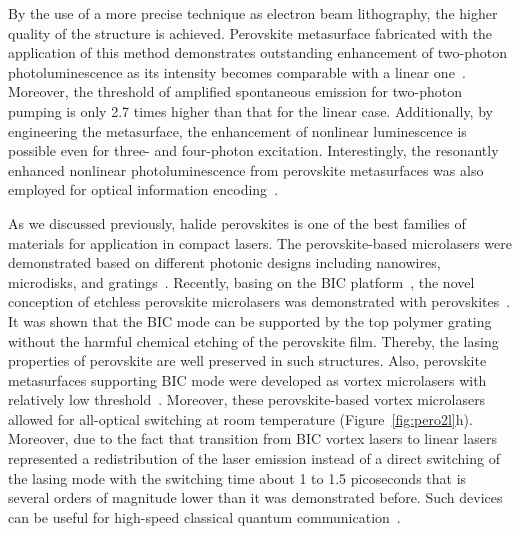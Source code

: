 \documentclass[journal=chreay,manuscript=review]{achemso}
\begin{document}
By the use of a more precise technique as electron beam lithography, the higher quality of the structure is achieved. Perovskite metasurface fabricated with the application of this method demonstrates outstanding enhancement of two-photon photoluminescence as its intensity becomes comparable with a linear one~\cite{fan2021enhanced}. Moreover, the threshold of amplified spontaneous emission for two-photon pumping is only 2.7 times higher than that for the linear case. Additionally, by engineering the metasurface, the enhancement of nonlinear luminescence is possible even for three- and four-photon excitation. Interestingly, the resonantly enhanced nonlinear photoluminescence from perovskite metasurfaces was also employed for optical information encoding~\cite{fan2019resonance}.


As we discussed previously, halide perovskites is one of the best families of materials for application in compact lasers. The perovskite-based microlasers were demonstrated based on different photonic designs including nanowires, microdisks, and gratings~\cite{zhu2015lead,zhang2017advances,wei2019recent,polushkin2020single,qin2020stable}. Recently, basing on the BIC platform~\cite{kodigala2017lasing}, the novel conception of etchless perovskite microlasers was demonstrated with perovskites~\cite{wang2021highly}. It was shown that the BIC mode can be supported by the top polymer grating without the harmful chemical etching of the perovskite film. Thereby, the lasing properties of perovskite are well preserved in such structures. Also, perovskite metasurfaces supporting BIC mode were developed as vortex microlasers with relatively low threshold~\cite{huang2020ultrafast}. Moreover, these perovskite-based vortex microlasers allowed for all-optical switching at room temperature (Figure~\ref{fig:pero2l}h). Moreover, due to the fact that transition from BIC vortex lasers to linear lasers represented a redistribution of the laser emission instead of a direct switching of the lasing mode with the switching time about 1 to 1.5 picoseconds that is several orders of magnitude lower than it was demonstrated before. Such devices can be useful for high-speed classical quantum communication~\cite{qiu2017vortex}.

\end{document}
